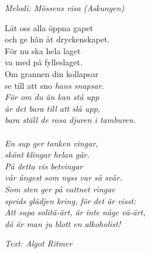 {\footnotesize\textit{Melodi: Mössens visa (Askungen)}}\par
\vspace{10pt}
Låt oss alla öppna gapet\\
och ge hän åt dryckenskapet.\\
För nu ska hela laget\\
va med på fylleslaget.\\
Om grannen din kollapsar\\
se till att sno \it{hans} snapsar.\\
För om du än kan stå upp\\
är det bara till att slå upp,\\
bara ställ de rosa djuren i tamburen.\\
\\
En sup ger tanken vingar,\\
skönt klingar helan går.\\
På detta vis betvingar\\
vår ångest som nyss var så svår.\\
Som sten ger på vattnet ringar\\
sprids glädjen kring, för det är visst:\\
Att supa solitä-ärt, är inte någe vä-ärt,\\
då är man ju blott en alkoholist!\\
\par
\vspace{10pt}
{\footnotesize\textit{Text: Algot Ritmer}}
